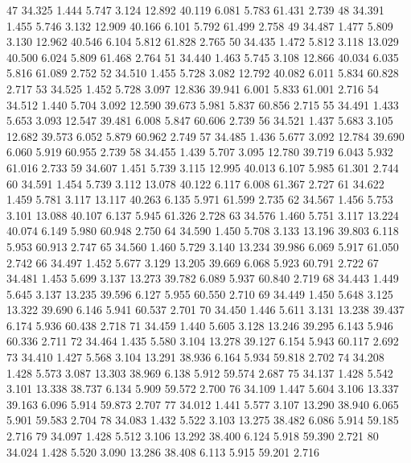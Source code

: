 \documentclass[a4paper,11pt]{scrartcl}
\begin{document}
\begin{Schunk}
\begin{Soutput}
47  34.325  1.444  5.747  3.124 12.892   40.119  6.081  5.783   61.431  2.739
48  34.391  1.455  5.746  3.132 12.909   40.166  6.101  5.792   61.499  2.758
49  34.487  1.477  5.809  3.130 12.962   40.546  6.104  5.812   61.828  2.765
50  34.435  1.472  5.812  3.118 13.029   40.500  6.024  5.809   61.468  2.764
51  34.440  1.463  5.745  3.108 12.866   40.034  6.035  5.816   61.089  2.752
52  34.510  1.455  5.728  3.082 12.792   40.082  6.011  5.834   60.828  2.717
53  34.525  1.452  5.728  3.097 12.836   39.941  6.001  5.833   61.001  2.716
54  34.512  1.440  5.704  3.092 12.590   39.673  5.981  5.837   60.856  2.715
55  34.491  1.433  5.653  3.093 12.547   39.481  6.008  5.847   60.606  2.739
56  34.521  1.437  5.683  3.105 12.682   39.573  6.052  5.879   60.962  2.749
57  34.485  1.436  5.677  3.092 12.784   39.690  6.060  5.919   60.955  2.739
58  34.455  1.439  5.707  3.095 12.780   39.719  6.043  5.932   61.016  2.733
59  34.607  1.451  5.739  3.115 12.995   40.013  6.107  5.985   61.301  2.744
60  34.591  1.454  5.739  3.112 13.078   40.122  6.117  6.008   61.367  2.727
61  34.622  1.459  5.781  3.117 13.117   40.263  6.135  5.971   61.599  2.735
62  34.567  1.456  5.753  3.101 13.088   40.107  6.137  5.945   61.326  2.728
63  34.576  1.460  5.751  3.117 13.224   40.074  6.149  5.980   60.948  2.750
64  34.590  1.450  5.708  3.133 13.196   39.803  6.118  5.953   60.913  2.747
65  34.560  1.460  5.729  3.140 13.234   39.986  6.069  5.917   61.050  2.742
66  34.497  1.452  5.677  3.129 13.205   39.669  6.068  5.923   60.791  2.722
67  34.481  1.453  5.699  3.137 13.273   39.782  6.089  5.937   60.840  2.719
68  34.443  1.449  5.645  3.137 13.235   39.596  6.127  5.955   60.550  2.710
69  34.449  1.450  5.648  3.125 13.322   39.690  6.146  5.941   60.537  2.701
70  34.450  1.446  5.611  3.131 13.238   39.437  6.174  5.936   60.438  2.718
71  34.459  1.440  5.605  3.128 13.246   39.295  6.143  5.946   60.336  2.711
72  34.464  1.435  5.580  3.104 13.278   39.127  6.154  5.943   60.117  2.692
73  34.410  1.427  5.568  3.104 13.291   38.936  6.164  5.934   59.818  2.702
74  34.208  1.428  5.573  3.087 13.303   38.969  6.138  5.912   59.574  2.687
75  34.137  1.428  5.542  3.101 13.338   38.737  6.134  5.909   59.572  2.700
76  34.109  1.447  5.604  3.106 13.337   39.163  6.096  5.914   59.873  2.707
77  34.012  1.441  5.577  3.107 13.290   38.940  6.065  5.901   59.583  2.704
78  34.083  1.432  5.522  3.103 13.275   38.482  6.086  5.914   59.185  2.716
79  34.097  1.428  5.512  3.106 13.292   38.400  6.124  5.918   59.390  2.721
80  34.024  1.428  5.520  3.090 13.286   38.408  6.113  5.915   59.201  2.716

\end{Soutput}
\end{Schunk}
\end{document}
